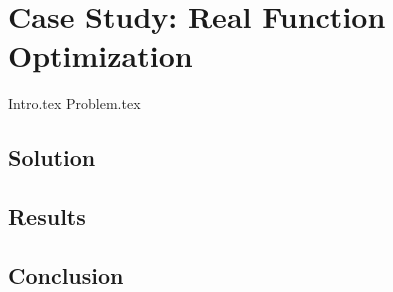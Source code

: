 \chapter{Case Study: Real Function Optimization}
\label{chap:fn_opt}
  {Intro.tex}
  {Problem.tex}
  
  \section{Solution}
  \label{sec:fn_opt:sol}
    \Blindtext
  \section{Results}
  \label{sec:fn_opt:results}
    \Blindtext
  \section{Conclusion}
  \label{sec:fn_opt:conclusion}
    \Blindtext
